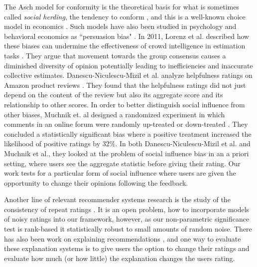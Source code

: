 The Asch model for conformity is the theoretical basis for what is sometimes called \emph{social herding}, the tendency to conform \cite{banerjee1992simple,bikhchandani2000herd}, and this is a well-known choice model in economics \cite{burnkrant1975informational,dholakia2002auction,huang2006herding}. 
Such models have also been studied in psychology and behavioral economics as ``persuasion bias" \cite{demarzo2003persuasion, hong2004social, golub2010naive, dellavigna2009persuasion}.
In 2011, Lorenz et al. described how these biases can undermine the effectiveness of crowd intelligence in estimation tasks \cite{lorenz2011social}. 
They argue that movement towards the group consensus causes a diminished diversity of opinion potentially leading to inefficiencies and inaccurate collective estimates.
Danescu-Niculescu-Mizil et al. analyze helpfulness ratings on Amazon product reviews \cite{danescu2009opinions}.
They found that the helpfulness ratings did not just depend on the content of the review but also its aggregate score and its relationship to other scores.
In order to better distinguish social influence from other biases, Muchnik et. al designed a randomized experiment in which comments in an online forum were randomly up-treated or down-treated \cite{muchnik2013social}.
They concluded a statistically significant bias where a positive treatment increased the likelihood of positive ratings by 32\%. 
In both Danescu-Niculescu-Mizil et al. and Muchnik et al., they looked at the problem of social influence bias in an a priori setting, where users see the aggregate statistic before giving their rating.
Our work tests for a particular form of social influence where users are given the opportunity to change their opinions following the feedback. 

Another line of relevant recommender systems research is the study of the consistency of repeat ratings \cite{amatriain2009rate, amatriain2009like}.
It is an open problem, how to incorporate models of noisy ratings into our framework, however, as our non-parametric significance test is rank-based it statistically robust to small amounts of random noise.
There has also been work on explaining recommendations \cite{bilgic2005explaining, tintarev2007survey}, and one way to evaluate these explanation systems is to give users the option to change their ratings and evaluate how much (or how little) the explanation changes the users rating.


